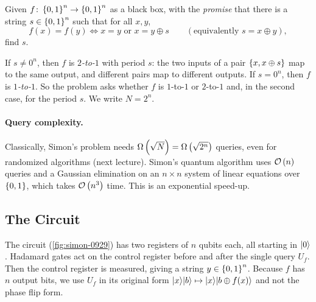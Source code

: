 \begin{problem}
    Given $f \colon \left\lbrace0,1\right\rbrace^n \to \left\lbrace0,1\right\rbrace^n$ as a black box, with the \emph{promise} that there is a
    string $s \in \left\lbrace0,1\right\rbrace^n$ such that for all $x, y$,
    \[f(x) = f(y) \iff x = y \text{ or } x = y \oplus s
        \qquad (\text{equivalently } s = x \oplus y),\]
    find $s$.
\end{problem}

If $s \neq 0^n$, then $f$ is \emph{$2$-to-$1$} with period $s$: the two inputs of a pair
$\left\lbrace x, x \oplus s\right\rbrace$ map to the same output, and different pairs map to different outputs. If
$s = 0^n$, then $f$ is \emph{$1$-to-$1$}. So the problem asks whether $f$ is $1$-to-$1$ or $2$-to-$1$
and, in the second case, for the period $s$. We write $N = 2^n$.

\paragraph{Query complexity.} Classically, Simon's problem needs $\Omega\left(\sqrt{N}\right) = \Omega\left(\sqrt{2^n}\right)$
queries, even for randomized algorithms (next lecture). Simon's quantum algorithm uses $\mathcal{O}\left(n\right)$
queries and a Gaussian elimination on an $n \times n$ system of linear equations over $\left\lbrace0,1\right\rbrace$,
which takes $\mathcal{O}\left(n^3\right)$ time. This is an exponential speed-up.

\subsection{The Circuit}

The circuit (\cref{fig:simon-0929}) has two registers of $n$ qubits each, all starting in $\lvert 0 \rangle$.
Hadamard gates act on the control register before and after the single query $U_f$. Then the control
register is measured, giving a string $y \in \left\lbrace0,1\right\rbrace^n$. Because $f$ has $n$ output bits, we use
$U_f$ in its original form $\lvert x \rangle\lvert b \rangle \mapsto \lvert x \rangle\lvert b \oplus f(x) \rangle$ and not the phase flip
form.

